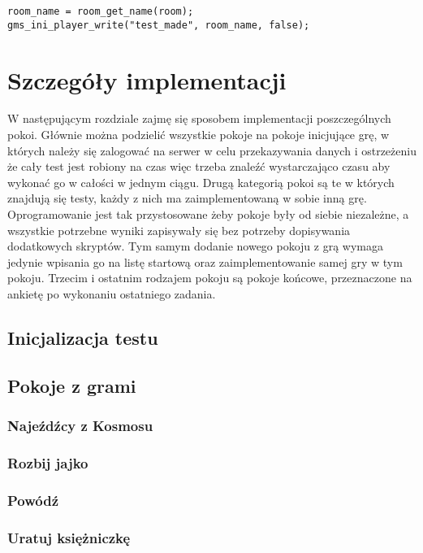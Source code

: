 \documentclass[openright]{xmgr}
\begin{document}
\begin{lstlisting}[caption={Fragment skryptu w przypadku końca czasu}]
room_name = room_get_name(room);
gms_ini_player_write("test_made", room_name, false);
\end{lstlisting}



\chapter{Szczegóły implementacji}
W następującym rozdziale zajmę się sposobem implementacji poszczególnych pokoi. Głównie można podzielić wszystkie pokoje na pokoje inicjujące grę, w których należy się zalogować na serwer w celu przekazywania danych i ostrzeżeniu że cały test jest robiony na czas więc trzeba znaleźć wystarczająco czasu aby wykonać go w całości w jednym ciągu. Drugą kategorią pokoi są te w których znajdują się testy, każdy z nich ma zaimplementowaną w sobie inną grę. Oprogramowanie jest tak przystosowane żeby pokoje były od siebie niezależne, a wszystkie potrzebne wyniki zapisywały się bez potrzeby dopisywania dodatkowych skryptów. Tym samym dodanie nowego pokoju z grą wymaga jedynie wpisania go na listę startową oraz zaimplementowanie samej gry w tym pokoju. Trzecim i ostatnim rodzajem pokoju są pokoje końcowe, przeznaczone na ankietę po wykonaniu ostatniego zadania.

\section{Inicjalizacja testu}


\section{Pokoje z grami}
\subsection{Najeźdźcy z Kosmosu}
\subsection{Rozbij jajko}
\subsection{Powódź}
\subsection{Uratuj księżniczkę}
\end{document}

